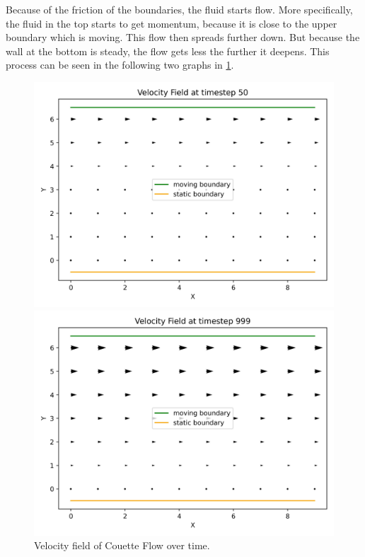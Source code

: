Because of the friction of the boundaries, the fluid starts flow.
More specifically, the fluid in the top starts to get momentum, because it is close to the upper boundary which is moving.
This flow then spreads further down.
But because the wall at the bottom is steady, the flow gets less the further it deepens.
This process can be seen in the following two graphs in \cref{fig:cf-velocity-field-over-time}.


\begin{center}
    \begin{figure}[H]
        \begin{minipage}{0.5\textwidth}
            \includegraphics[width=\linewidth]{graphs/CouetteFlow/velocity_field_couette_flow_50}
        \end{minipage}%
        \begin{minipage}{0.5\textwidth}
            \includegraphics[width=\linewidth]{graphs/CouetteFlow/velocity_field_couette_flow_999}
        \end{minipage}
        \caption{Velocity field of Couette Flow over time.}
        \label{fig:cf-velocity-field-over-time}
    \end{figure}
\end{center}

